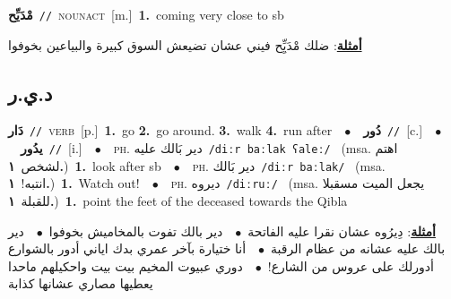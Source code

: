 \documentclass[10pt,a4paper,twoside]{article} %
\begin{document}
\begin{multicols}{2}
{\setlength\topsep{0pt}\textbf{\foreignlanguage{arabic}{مْدَيِّح}}\ {\color{gray}\texttt{//}\color{black}}\ \textsc{noun\textunderscore act}\ [m.]\ \textbf{1.}~coming very close to sb\  \begin{flushright}\color{gray}\foreignlanguage{arabic}{\textbf{\underline{\foreignlanguage{arabic}{أمثلة}}}: ضلك مْدَيِِّح فيني عشان تضيعش السوق كبيرة والبياعين بخوفوا}\end{flushright}\color{black}} \vspace{2mm}

\vspace{-3mm}
\subsection*{\color{blue}\foreignlanguage{arabic}{د.ي.ر}\color{blue}{}} 

{\setlength\topsep{0pt}\textbf{\foreignlanguage{arabic}{دَار}}\ {\color{gray}\texttt{//}\color{black}}\ \textsc{verb}\ [p.]\ \textbf{1.}~go  \textbf{2.}~go around.  \textbf{3.}~walk  \textbf{4.}~run after\ \ $\bullet$\ \ \setlength\topsep{0pt}\textbf{\foreignlanguage{arabic}{دُور}}\ {\color{gray}\texttt{//}\color{black}}\ [c.]\ \ $\bullet$\ \ \setlength\topsep{0pt}\textbf{\foreignlanguage{arabic}{يدُور}}\ {\color{gray}\texttt{//}\color{black}}\ [i.]\ \ $\bullet$\ \ \textsc{ph.} \color{gray} \foreignlanguage{arabic}{دير بَالك عليه}\color{black}\ {\color{gray}\texttt{/{\sffamily diːr baːlak ʕaleː}/}\color{black}}\ \color{gray} (msa. \foreignlanguage{arabic}{اهتم لشخص}~\foreignlanguage{arabic}{\textbf{١.}})\color{black}\ \textbf{1.}~look after sb\ \ $\bullet$\ \ \textsc{ph.} \color{gray} \foreignlanguage{arabic}{دير بَالك}\color{black}\ {\color{gray}\texttt{/{\sffamily diːr baːlak}/}\color{black}}\ \color{gray} (msa. \foreignlanguage{arabic}{انتبه!}~\foreignlanguage{arabic}{\textbf{١.}})\color{black}\ \textbf{1.}~Watch out!\ \ $\bullet$\ \ \textsc{ph.} \color{gray} \foreignlanguage{arabic}{ديروه}\color{black}\ {\color{gray}\texttt{/{\sffamily diːruː}/}\color{black}}\ \color{gray} (msa. \foreignlanguage{arabic}{يجعل الميت مسقبلا للقبلة}~\foreignlanguage{arabic}{\textbf{١.}})\color{black}\ \textbf{1.}~point the feet of the deceased towards the Qibla\  \begin{flushright}\color{gray}\foreignlanguage{arabic}{\textbf{\underline{\foreignlanguage{arabic}{أمثلة}}}: دِيرُوه عشان نقرا عليه الفاتحة\ $\bullet$\ \  دير بالك تفوت بالمخاميش بخوفوا\ $\bullet$\ \  دير بالك عليه عشانه من عظام الرقبة\ $\bullet$\ \  أنا ختيارة بآخر عمري بدك اياني أدور بالشوارع أدورلك على عروس من الشارع!\ $\bullet$\ \  دوري عبيوت المخيم بيت بيت واحكيلهم ماحدا يعطيها مصاري عشانها كذابة}\end{flushright}\color{black}} \vspace{2mm}


\end{multicols}
\end{document}
